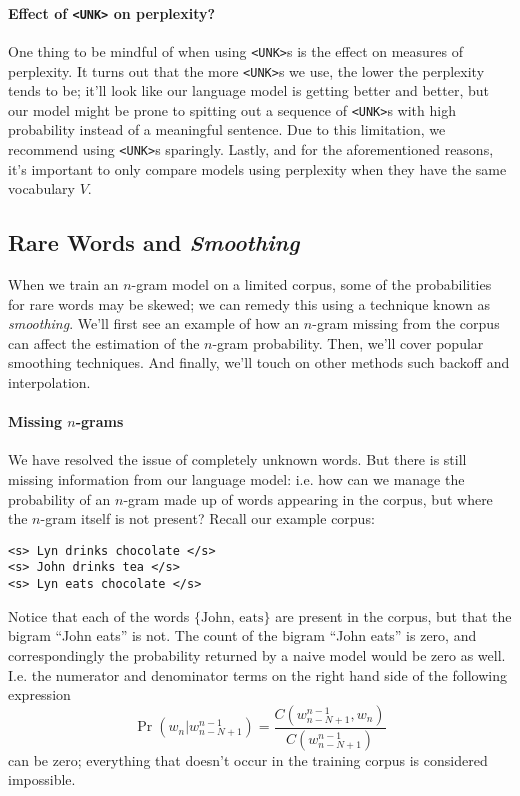 \documentclass[12pt]{article}
\begin{document}
\paragraph{Effect of \texttt{<UNK>} on perplexity?} One thing to be mindful of when using \texttt{<UNK>}s is the effect on measures of perplexity. It turns out that the more \texttt{<UNK>}s we use, the lower the perplexity tends to be; it'll look like our language model is getting better and better, but our model might be prone to spitting out a sequence of \texttt{<UNK>}s with high probability instead of a meaningful sentence. Due to this limitation, we recommend using \texttt{<UNK>}s sparingly. Lastly, and for the aforementioned reasons, it's important to only compare models using perplexity when they have the same vocabulary $V$.

\subsection{Rare Words and \emph{Smoothing}} When we train an $n$-gram model on a limited corpus, some of the probabilities for rare words may be skewed; we can remedy this using a technique known as \emph{smoothing}. We'll first see an example of how an $n$-gram missing from the corpus can affect the estimation of the $n$-gram probability. Then, we'll cover popular smoothing techniques. And finally, we'll touch on other methods such backoff and interpolation.

\paragraph{Missing $n$-grams} We have resolved the issue of completely unknown words. But there is still missing information from our language model: i.e. how can we manage the probability of an $n$-gram made up of words appearing in the corpus, but where the $n$-gram itself is not present? Recall our example corpus:
\begin{verbatim}
<s> Lyn drinks chocolate </s>
<s> John drinks tea </s>
<s> Lyn eats chocolate </s>
\end{verbatim}
Notice that each of the words $\{\textrm{John, eats}\}$ are present in the corpus, but that the bigram ``John eats'' is not. The count of the bigram ``John eats'' is zero, and correspondingly the probability returned by a naive model would be zero as well. I.e. the numerator and denominator terms on the right hand side of the following expression
\[
  \Pr(w_n | w_{n-N+1}^{n-1}) = \frac{C(w_{n-N+1}^{n-1}, w_n)}{C(w_{n-N+1}^{n-1})}
\]
can be zero; everything that doesn't occur in the training corpus is considered impossible.
\end{document}
